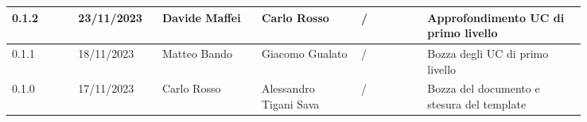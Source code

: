 {\begin{longtable}{p{0.10\linewidth}p{0.10\linewidth}p{0.15\linewidth}p{0.15\linewidth}p{0.10\linewidth}p{0.24\linewidth}}
	  \hline
	  0.1.2             & 23/11/2023    & Davide Maffei          & Carlo Rosso            & /                      & Approfondimento UC di primo livello                                      \\
	  \hline
	  0.1.1             & 18/11/2023    & Matteo Bando           & Giacomo Gualato        & /                      & Bozza degli UC di primo livello                                          \\
	  \hline
	  0.1.0             & 17/11/2023    & Carlo Rosso            & Alessandro Tigani Sava & /                      & Bozza del documento e stesura del template                               \\
  \end{longtable}
 }
